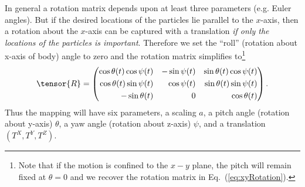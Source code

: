 \documentclass[aps, prd, amsmath, floats, floatfix, twocolumn,superscriptaddress, nofootinbib, showpacs]{revtex4-1}
\theoremstyle{plain}
\theoremstyle{definition}
\begin{document}
In general a rotation matrix depends upon at least three parameters
(e.g. Euler angles).  But if the desired locations of the particles
lie parallel to the $x$-axis, then a rotation about the $x$-axis can
be captured with a translation {\em if only the locations of the
particles is important}.  Therefore we set the ``roll'' (rotation
about x-axis of body) angle to zero and the rotation matrix simplifies
to\footnote{Note that if the motion is confined to the $x-y$ plane,
the pitch will remain fixed at $\theta = 0$ and we recover the rotation
matrix in Eq.~(\ref{eq:xyRotation}).}
\begin{equation}\label{eq:PitchYawRotation} \tensor{R} = \left(
\begin{aligned}
\cos{\theta(t)} \cos{\psi(t)} && - \sin{\psi(t)} && \sin{\theta(t)}
\cos{\psi(t)} \\ \cos{\theta(t)} \sin{\psi(t)} && \cos{\psi(t)} &&
\sin{\theta(t)} \sin{\psi(t)} \\ -\sin{\theta(t)} & & 0 &&
\cos{\theta(t)}
\end{aligned}
 \right).
\end{equation}
Thus the mapping will have six parameters, a scaling $a$, a
pitch angle (rotation about y-axis) $\theta$, a yaw angle (rotation
about z-axis) $\psi$, and a translation $(T^X,T^Y,T^Z)$.
\end{document}
